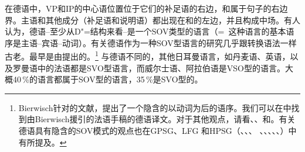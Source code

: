 \addlines[-1]
在德语中，VP和IP的中心语位置位于它们的补足语的右边，\vnull 和\inull 属于句子的右边界。主语和其他成分（补足语和说明语）都出现在\vnull 和\inull 的左边，并且构成中场。有人认为，德语--至少从D"=结构来看--是一个SOV类型的语言（=~这种语言的基本语序是主语--宾语--动词）。有关德语作为一种SOV型语言的研究几乎跟转换语法一样古老。最早是由\citet*[]{Bierwisch63}提出的。\footnote{
Bierwisch针对\citet{Fourquet57a}的文献，提出了一个隐含的以动词为后的语序。我们可以在中找到由Bierwisch援引的法语手稿的德语译文。对于其他观点，请看、、和。有关德语具有隐含的SOV模式的观点也在GPSG\citep[]{Jacobs86a}、LFG \citep[Section~2.1.4]{Berman96a-u} 和HPSG（\citealp*{KW91a}、\citealp{Oliva92a}、\citealp*{Netter92}、
\citealp*{Kiss93}、\citealp*{Frank94}、\citealp*{Kiss95a}、\citealp{Feldhaus97}、\citealp{Meurers2000b}、\citealp{Mueller2005c,MuellerGS}）中有所提及。
}
与德语不同的，其他日耳曼语言，如丹麦语、英语，以及罗曼语中的法语都是SVO型语言，而威尔士语、阿拉伯语是VSO型的语言。大概40\,\%的语言都属于SOV型的语言，35\,\%是SVO型的\citep{wals-81}。

